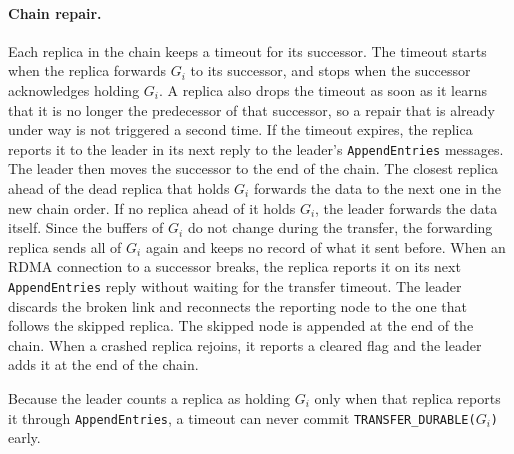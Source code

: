 \paragraph{Chain repair.}
Each replica in the chain keeps a timeout for its successor.
The timeout starts when the replica forwards $G_i$ to its successor, and stops when the successor acknowledges holding $G_i$.
A replica also drops the timeout as soon as it learns that it is no longer the predecessor of that successor, so a repair that is already under way is not triggered a second time.
If the timeout expires, the replica reports it to the leader in its next reply to the leader's \texttt{AppendEntries} messages.
The leader then moves the successor to the end of the chain.
The closest replica ahead of the dead replica that holds $G_i$ forwards the data to the next one in the new chain order.
If no replica ahead of it holds $G_i$, the leader forwards the data itself.
Since the buffers of $G_i$ do not change during the transfer, the forwarding replica sends all of $G_i$ again and keeps no record of what it sent before.
When an RDMA connection to a successor breaks, the replica reports it on its next \texttt{AppendEntries} reply without waiting for the transfer timeout.
The leader discards the broken link and reconnects the reporting node to the one that follows the skipped replica.
The skipped node is appended at the end of the chain.
When a crashed replica rejoins, it reports a cleared flag and the leader adds it at the end of the chain.

Because the leader counts a replica as holding $G_i$ only when that replica reports it through \texttt{AppendEntries}, a timeout can never commit \texttt{TRANSFER\_DURABLE($G_i$)} early.
